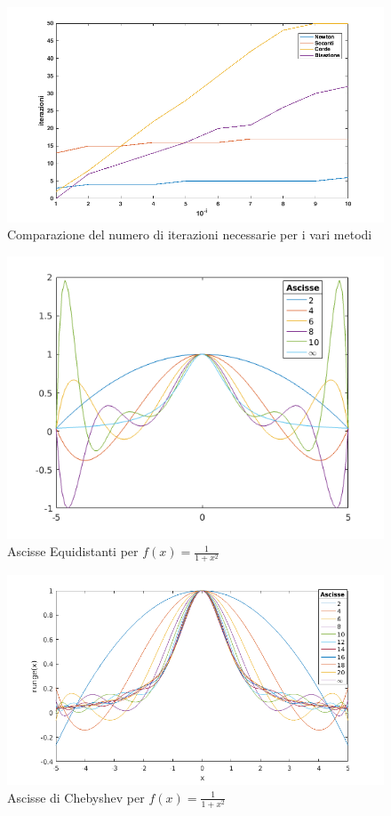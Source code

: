 \begin{figure}[h]
\includegraphics[width=\textwidth]{cap_2/es7/compar}
\caption{Comparazione del numero di iterazioni necessarie per i vari metodi}
\label{compar}
\end{figure}

\begin{figure}[h]
\includegraphics[width=\textwidth]{cap_4/es2/Runge_equi.png}
\caption{Ascisse Equidistanti per $f(x) = \frac{1}{1+x^2}$}
\label{RungeEq}
\end{figure}

\begin{figure}
\includegraphics[width=\textwidth]{cap_4/es2/Runge_cheb.png}
\caption{Ascisse di Chebyshev per $f(x) = \frac{1}{1+x^2}$}
\label{RungeChe}
\end{figure}


